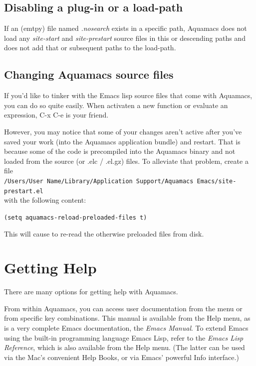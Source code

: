 \documentclass[11pt,letterpaper]{article}
\newcommand{\ttfile}{\tt}
\begin{document}
\subsection{Disabling a plug-in or a load-path}

If an (emtpy) file named \emph{.nosearch} exists in a specific path, Aquamacs does not load any \emph
{site-start} and \emph{site-prestart} source files in this or descending paths and does not add that or 
subsequent paths to the load-path. 


\subsection{Changing Aquamacs source files}

If you'd like to tinker with the Emacs lisp source files that come with Aquamacs, you can do so quite easily. When activaten a new function or evaluate an expression, C-x C-e is your friend.

However, you may notice that some of your changes aren't active after you've saved your work (into the Aquamacs application bundle) and restart. That is because some of the code is precompiled into the Aquamacs binary and not loaded from the source (or .elc / .el.gz) files. To alleviate that problem, create a
file\\
{\ttfile /Users/User Name/Library/Application Support/Aquamacs Emacs/site-prestart.el} \\ with the following content:

\texttt{(setq aquamacs-reload-preloaded-files t)}

This will cause to re-read the otherwise preloaded files from disk.

\section{Getting Help}

There are many options for getting help with Aquamacs.

From within Aquamacs, you can access user documentation from the menu or from specific key combinations.  This manual is available from the Help menu, as is a very complete Emacs documentation, the \emph{Emacs Manual}.  To extend Emacs using the built-in programming language Emacs Lisp, refer to the \emph{Emacs Lisp Reference}, which is also available from the Help menu.  (The latter can be used via the Mac's convenient Help Books, or via Emacs' powerful Info interface.)
\end{document}
